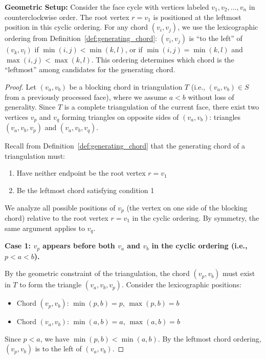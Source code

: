 \documentclass[12pt,a4paper]{article}
\theoremstyle{definition}
\theoremstyle{remark}
\begin{document}
\textbf{Geometric Setup:} Consider the face cycle with vertices labeled $v_1, v_2, \ldots, v_n$ in counterclockwise order. The root vertex $r = v_1$ is positioned at the leftmost position in this cyclic ordering. For any chord $(v_i, v_j)$, we use the lexicographic ordering from Definition~\ref{def:generating_chord}: $(v_i, v_j)$ is ``to the left'' of $(v_k, v_l)$ if $\min(i,j) < \min(k,l)$, or if $\min(i,j) = \min(k,l)$ and $\max(i,j) < \max(k,l)$. This ordering determines which chord is the ``leftmost'' among candidates for the generating chord.

\begin{proof}
Let $(v_a, v_b)$ be a blocking chord in triangulation $T$ (i.e., $(v_a, v_b) \in S$ from a previously processed face), where we assume $a < b$ without loss of generality. Since $T$ is a complete triangulation of the current face, there exist two vertices $v_p$ and $v_q$ forming triangles on opposite sides of $(v_a, v_b)$: triangles $(v_a, v_b, v_p)$ and $(v_a, v_b, v_q)$.

Recall from Definition~\ref{def:generating_chord} that the generating chord of a triangulation must:
\begin{enumerate}
    \item Have neither endpoint be the root vertex $r = v_1$
    \item Be the leftmost chord satisfying condition 1
\end{enumerate}

We analyze all possible positions of $v_p$ (the vertex on one side of the blocking chord) relative to the root vertex $r = v_1$ in the cyclic ordering. By symmetry, the same argument applies to $v_q$.

\textbf{Case 1: $v_p$ appears before both $v_a$ and $v_b$ in the cyclic ordering (i.e., $p < a < b$).}

By the geometric constraint of the triangulation, the chord $(v_p, v_b)$ must exist in $T$ to form the triangle $(v_a, v_b, v_p)$. Consider the lexicographic positions:
\begin{itemize}
    \item Chord $(v_p, v_b)$: $\min(p, b) = p$, $\max(p, b) = b$
    \item Chord $(v_a, v_b)$: $\min(a, b) = a$, $\max(a, b) = b$
\end{itemize}

Since $p < a$, we have $\min(p, b) < \min(a, b)$. By the leftmost chord ordering, $(v_p, v_b)$ is to the left of $(v_a, v_b)$. 


\end{proof}
\end{document}
